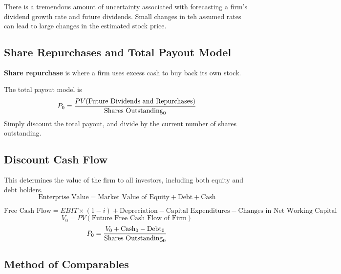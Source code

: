 \documentclass[english, 12pt]{article}
\begin{document}
\begin{note}
There is a tremendous amount of uncertainty associated with forecasting a firm's dividend growth rate and future dividends. Small changes in teh assumed rates can lead to large changes in the estimated stock price.
\end{note}

\subsection{Share Repurchases and Total Payout Model}

\begin{defn}
\textbf{Share repurchase} is where a firm uses excess cash to buy back its own stock.
\end{defn}
The total payout model is
\[P_0 = \frac{PV(\text{Future Dividends and Repurchases})}{\text{Shares Outstanding}_0}\]
Simply discount the total payout, and divide by the current number of shares outstanding.

\subsection{Discount Cash Flow}
This determines the value of the firm to all investors, including both equity and debt holders.
\[\text{Enterprise Value} = \text{Market Value of Equity} + \text{Debt} + \text{Cash}\]

\[\text{Free Cash Flow} = EBIT \times (1 - i) + \text{Depreciation} - \text{Capital Expenditures} - \text{Changes in Net Working Capital}\]
\[V_0 = PV(\text{Future Free Cash Flow of Firm})\]
\[P_0 = \frac{V_0 + \text{Cash}_0 - \text{Debt}_0}{\text{Shares Outstanding}_0}\]

\subsection{Method of Comparables}

\end{document}
